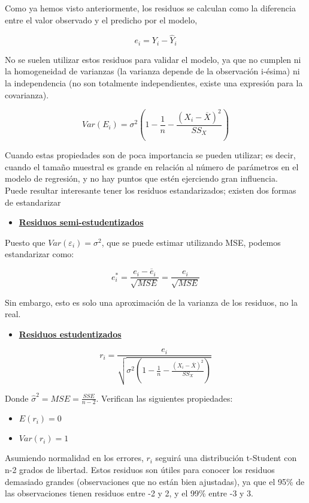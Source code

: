 Como ya hemos visto anteriormente, los residuos se calculan como la diferencia entre el valor observado y el predicho por el modelo,

$$
e_i=Y_i-\hat Y_i
$$

No se suelen utilizar estos residuos para validar el modelo, ya que no cumplen ni la homogeneidad de varianzas (la varianza depende de la observación i-ésima) ni la independencia (no son totalmente independientes, existe una expresión para la covarianza). 

$$
Var(E_i)=\sigma^2\left(1-\frac{1}{n}-\frac{(X_i-\overline{X})^2}{SS_X}\right)
$$

Cuando estas propiedades son de poca importancia se pueden utilizar; es decir, cuando el tamaño muestral es grande en relación al número de parámetros en el modelo de regresión, y no hay puntos que estén ejerciendo gran influencia.\\

Puede resultar interesante tener los residuos estandarizados; existen dos formas de estandarizar

\begin{itemize}
    \item \textbf{\underline{Residuos semi-estudentizados}}
\end{itemize}

Puesto que $Var(\varepsilon_i)=\sigma^2$, que se puede estimar utilizando MSE, podemos estandarizar como:

$$
e^*_i=\frac{e_i-\overline{e}_i}{\sqrt{MSE}}=\frac{e_i}{\sqrt{MSE}}
$$

Sin embargo, esto es solo una aproximación de la varianza de los residuos, no la real.

\begin{itemize}
    \item \textbf{\underline{Residuos estudentizados}}
\end{itemize}

$$
r_i=\frac{e_i}{\sqrt{\sigma^2\left(1-\frac{1}{n}-\frac{(X_i-\overline{X})^2}{SS_X}\right)}}
$$

Donde $\hat\sigma^2=MSE=\frac{SSE}{n-2}$. Verifican las siguientes propiedades:

\begin{itemize}
    \item $E(r_i)=0$
    \item $Var(r_i)=1  $  
\end{itemize}

Asumiendo normalidad en los errores, $r_i$ seguirá una distribución t-Student con n-2 grados de libertad. Estos residuos son útiles para conocer los residuos demasiado grandes (observaciones que no están bien ajustadas), ya que el 95\% de las observaciones tienen residuos entre -2 y 2, y el 99\% entre -3 y 3.\\

